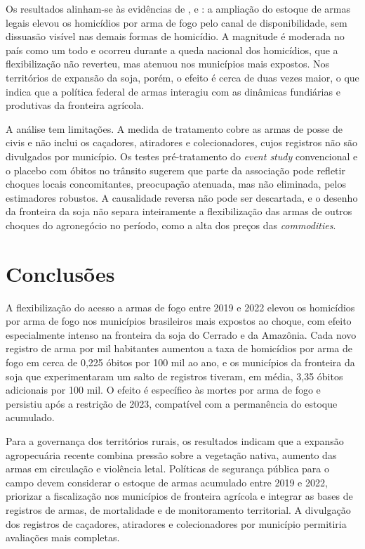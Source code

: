 \documentclass[12pt,a4paper]{article}
\begin{document}
Os resultados alinham-se às evidências de \citet{duggan2001}, \citet{cook2006} e \citet{cerqueira2012}: a ampliação do estoque de armas legais elevou os homicídios por arma de fogo pelo canal de disponibilidade, sem dissuasão visível nas demais formas de homicídio. A magnitude é moderada no país como um todo e ocorreu durante a queda nacional dos homicídios, que a flexibilização não reverteu, mas atenuou nos municípios mais expostos. Nos territórios de expansão da soja, porém, o efeito é cerca de duas vezes maior, o que indica que a política federal de armas interagiu com as dinâmicas fundiárias e produtivas da fronteira agrícola.

A análise tem limitações. A medida de tratamento cobre as armas de posse de civis e não inclui os caçadores, atiradores e colecionadores, cujos registros não são divulgados por município. Os testes pré-tratamento do \textit{event study} convencional e o placebo com óbitos no trânsito sugerem que parte da associação pode refletir choques locais concomitantes, preocupação atenuada, mas não eliminada, pelos estimadores robustos. A causalidade reversa não pode ser descartada, e o desenho da fronteira da soja não separa inteiramente a flexibilização das armas de outros choques do agronegócio no período, como a alta dos preços das \textit{commodities}.

\section{Conclusões}

A flexibilização do acesso a armas de fogo entre 2019 e 2022 elevou os homicídios por arma de fogo nos municípios brasileiros mais expostos ao choque, com efeito especialmente intenso na fronteira da soja do Cerrado e da Amazônia. Cada novo registro de arma por mil habitantes aumentou a taxa de homicídios por arma de fogo em cerca de 0{,}225 óbitos por 100 mil ao ano, e os municípios da fronteira da soja que experimentaram um salto de registros tiveram, em média, 3{,}35 óbitos adicionais por 100 mil. O efeito é específico às mortes por arma de fogo e persistiu após a restrição de 2023, compatível com a permanência do estoque acumulado.

Para a governança dos territórios rurais, os resultados indicam que a expansão agropecuária recente combina pressão sobre a vegetação nativa, aumento das armas em circulação e violência letal. Políticas de segurança pública para o campo devem considerar o estoque de armas acumulado entre 2019 e 2022, priorizar a fiscalização nos municípios de fronteira agrícola e integrar as bases de registros de armas, de mortalidade e de monitoramento territorial. A divulgação dos registros de caçadores, atiradores e colecionadores por município permitiria avaliações mais completas.



\end{document}
